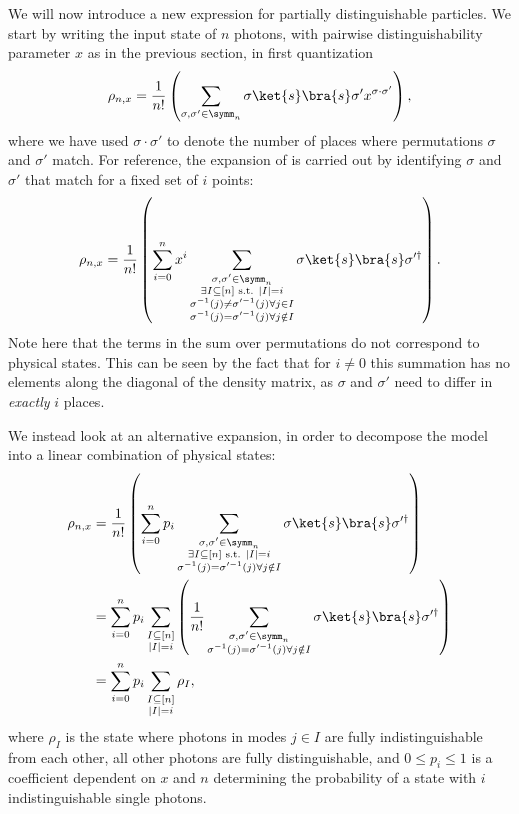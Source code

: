 We will now introduce a new expression for partially distinguishable particles. We start by writing the input state of $n$ photons, with pairwise distinguishability parameter $x$ as in the previous section, in first quantization
\begin{equation}
\label{eqn:rhon}
\rho_{n,x} = \frac{1}{n!}\left(\sum_{\sigma,\sigma'\in\symm_n}\sigma\ket{s}\bra{s}\sigma'x^{\sigma\cdot\sigma'}\right),
\end{equation}
where we have used $\sigma\cdot\sigma'$ to denote the number of places where permutations $\sigma$ and $\sigma'$ match.
For reference, the expansion of \cite{renema2018,renema2018loss} is carried out by identifying $\sigma$ and $\sigma'$ that match for a fixed set of $i$ points:
\begin{equation}
\label{eqn:rhoni}
\rho_{n,x} = \frac{1}{n!}\left(\sum_{i=0}^nx^i\sum_{\substack{\sigma,\sigma'\in\symm_n\\\exists I\subseteq [n] \textrm{ s.t. } |I|=i\\\sigma^{-1}(j)\neq\sigma'^{-1}(j)\forall j \in I\\\sigma^{-1}(j)=\sigma'^{-1}(j)\forall j \notin I}}\sigma\ket{s}\bra{s}\sigma'^\dagger\right).
\end{equation}
Note here that the terms in the sum over permutations do not correspond to physical states. 
This can be seen by the fact that for $i\neq 0$ this summation has no elements along the diagonal of the density matrix, as $\sigma$ and $\sigma'$ need to differ in \emph{exactly} $i$ places.

We instead look at an alternative expansion, in order to decompose the model into a linear combination of physical states:
\begin{align}
\rho_{n,x} &= \frac{1}{n!}\left(\sum_{i=0}^np_i\sum_{\substack{\sigma,\sigma'\in\symm_n\\\exists I\subseteq [n] \textrm{ s.t. } |I|=i\\\sigma^{-1}(j)=\sigma'^{-1}(j)\forall j \notin I}}\sigma\ket{s}\bra{s}\sigma'^\dagger\right)\label{eqn:state-expansion}\\
&= \sum_{i=0}^np_i\sum_{\substack{I\subseteq[n]\\|I|=i}}\left(\frac{1}{n!}\sum_{\substack{\sigma,\sigma'\in\symm_n\\\sigma^{-1}(j)=\sigma'^{-1}(j)\forall j \notin I}}\sigma\ket{s}\bra{s}\sigma'^\dagger\right)\\
&= \sum_{i=0}^np_i\sum_{\substack{I\subseteq[n]\\|I|=i}}\rho_I, \label{eq:newrho}
\end{align}
where $\rho_I$ is the state where photons in modes $j \in I$ are fully indistinguishable from each other, all other photons are fully distinguishable, and $0 \leq p_i \leq 1$ is a coefficient dependent on $x$ and $n$ determining the probability of a state with $i$ indistinguishable single photons.

